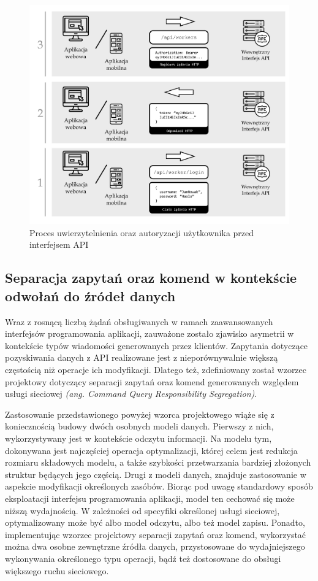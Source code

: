 \begin{figure}[ht]
 \centering
  \includegraphics[width=1\linewidth]{rys02/uwierzytelnianie-autoryzacja}
 \caption{Proces uwierzytelnienia oraz autoryzacji użytkownika przed interfejsem API}
 \label{fig:uwierzytelnienie-autoryzacja}
\end{figure}


\subsection*{Separacja zapytań oraz komend w kontekście odwołań do źródeł danych}
Wraz z rosnącą liczbą żądań obsługiwanych w ramach zaawansowanych interfejsów programowania aplikacji, zauważone zostało zjawisko asymetrii w kontekście typów wiadomości generowanych przez klientów. Zapytania dotyczące pozyskiwania danych z API realizowane jest z nieporównywalnie większą częstością niż operacje ich modyfikacji. Dlatego też, zdefiniowany został wzorzec projektowy dotyczący separacji zapytań oraz komend generowanych względem usługi sieciowej \textit{(ang. Command Query Responsibility Segregation)}.

Zastosowanie przedstawionego powyżej wzorca projektowego wiąże się z koniecznością budowy dwóch osobnych modeli danych. Pierwszy z nich, wykorzystywany jest w kontekście odczytu informacji. Na modelu tym, dokonywana jest najczęściej operacja optymalizacji, której celem jest redukcja rozmiaru składowych modelu, a także szybkości przetwarzania bardziej złożonych struktur będących jego częścią. Drugi z modeli danych, znajduje zastosowanie w aspekcie modyfikacji określonych zasóbów. Biorąc pod uwagę standardowy sposób eksploatacji interfejsu programowania aplikacji, model ten cechować się może niższą wydajnością. W zależności od specyfiki określonej usługi sieciowej, optymalizowany może być albo model odczytu, albo też model zapisu. Ponadto, implementując wzorzec projektowy separacji zapytań oraz komend, wykorzystać można dwa osobne zewnętrzne źródła danych, przystosowane do wydajniejszego wykonywania określonego typu operacji, bądź też dostosowane do obsługi większego ruchu sieciowego.   

